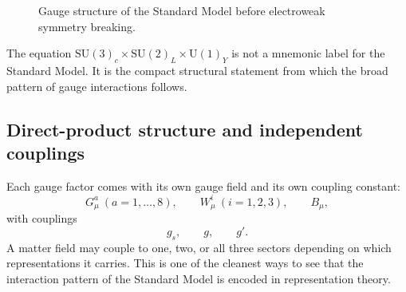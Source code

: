 \documentclass[11pt,a4paper]{article}
\newcommand{\SMgauge}{\mathrm{SU}(3)_c \times \mathrm{SU}(2)_L \times \mathrm{U}(1)_Y}
\begin{document}
\begin{figure}[H]
\centering
{}
\caption{Gauge structure of the Standard Model before electroweak symmetry breaking.}
\label{fig:sm-gauge-structure-expanded}
\end{figure}




\begin{takehomebox}
\vspace{0.25cm}
The equation {\color{red}\(\SMgauge\)} is not a mnemonic label for the Standard Model. It is the compact structural statement from which the broad pattern of gauge interactions follows.
\end{takehomebox}






\subsection{Direct-product structure and independent couplings}

Each gauge factor comes with its own gauge field and its own coupling constant:
\[
G_\mu^a\ (a=1,\dots,8),
\qquad
W_\mu^i\ (i=1,2,3),
\qquad
B_\mu,
\]
with couplings
\[
g_s,
\qquad g,
\qquad g'.
\]
A matter field may couple to one, two, or all three sectors depending on which representations it carries. This is one of the cleanest ways to see that the interaction pattern of the Standard Model is encoded in representation theory.
\end{document}

